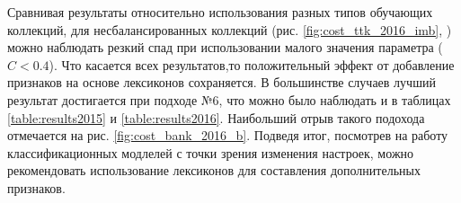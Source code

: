 

Сравнивая результаты относительно использования разных типов обучающих коллекций,
для несбалансированных коллекций (рис. \ref{fig:cost_ttk_2016_imb},
\label{fig:cost_bank_2016_imb})
можно наблюдать резкий спад при использовании малого значения параметра ($C < 0.4$).
Что касается всех результатов,то положительный эффект от добавление признаков
на основе лексиконов сохраняется.
В большинстве случаев лучший результат достигается при подходе №6, что
можно было наблюдать и в таблицах \ref{table:results2015} и \ref{table:results2016}.
Наибольший отрыв такого подохода отмечается на рис. \ref{fig:cost_bank_2016_b}.
Подведя итог, посмотрев на работу классификационных модлелей с точки зрения
изменения настроек, можно рекомендовать использование лексиконов для составления
дополнительных признаков.


